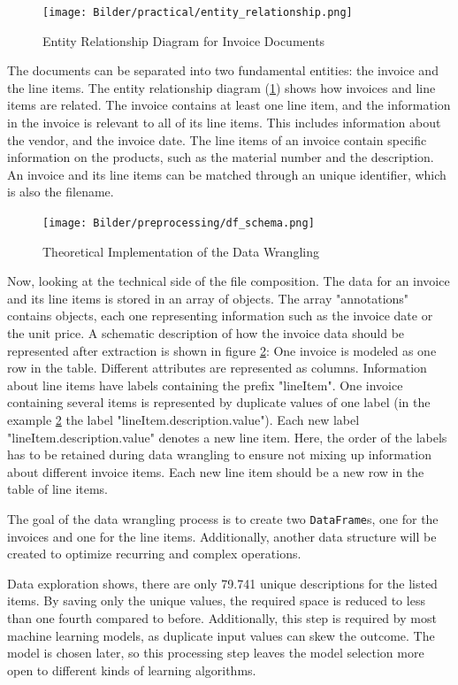     \begin{figure}[ht]
        \centering
        \texttt{[image: Bilder/practical/entity\_relationship.png]}
        \caption{Entity Relationship Diagram for Invoice Documents}
        \label{fig:er}
    \end{figure}
	The documents can be separated into two fundamental entities: the invoice and the line items. The entity relationship diagram (\ref{fig:er}) shows how invoices and line items are related. The invoice contains at least one line item, and the information in the invoice is relevant to all of its line items. This includes information about the vendor, and the invoice date. The line items of an invoice contain specific information on the products, such as the material number and the description.
	An invoice and its line items can be matched through an unique identifier, which is also the filename.

	 \begin{figure}[ht]
		\centering
		\texttt{[image: Bilder/preprocessing/df\_schema.png]}
		\caption{Theoretical Implementation of the Data Wrangling}
		\label{fig:invoice_df_schema}
	\end{figure}	

	Now, looking at the technical side of the file composition.	The data for an invoice and its line items is stored in an array of objects. The array "annotations" contains objects, each one representing information such as the invoice date or the unit price. A schematic description of how the invoice data should be represented after extraction is shown in figure \ref{fig:invoice_df_schema}: One invoice is modeled as one row in the table. Different attributes are represented as columns.
	Information about line items have labels containing the prefix "lineItem". One invoice containing several items is represented by duplicate values of one label (in the example \ref{fig:invoice_df_schema} the label "lineItem.description.value"). Each new label "lineItem.description.value" denotes a new line item. Here, the order of the labels has to be retained during data wrangling to ensure not mixing up information about different invoice items. Each new line item should be a new row in the table of line items.
	
	The goal of the data wrangling process is to create two \lstinline|DataFrame|s, one for the invoices and one for the line items.
	Additionally, another data structure will be created to optimize recurring and complex operations.
	
	Data exploration shows, there are only 79.741 unique descriptions for the listed items. By saving only the unique values, the required space is reduced to less than one fourth compared to before. Additionally, this step is required by most machine learning models, as duplicate input values can skew the outcome. The model is chosen later, so this processing step leaves the model selection more open to different kinds of learning algorithms.
	
